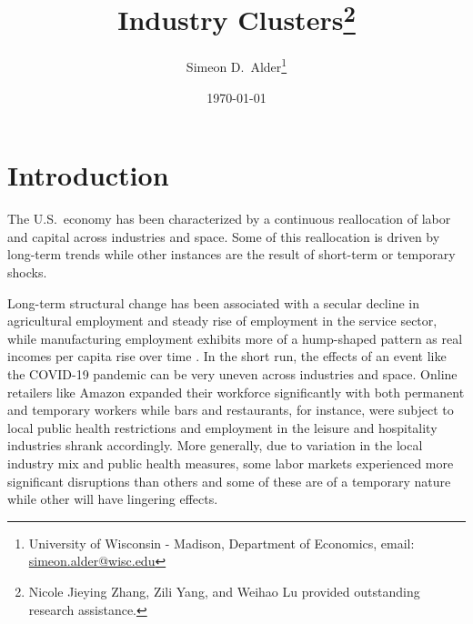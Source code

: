 \documentclass[onehalfspacing,11pt]{article}
\begin{document}
\begin{titlepage}

\title{Industry Clusters\footnote{Nicole Jieying Zhang, Zili Yang, and Weihao Lu provided outstanding research assistance.}}

\author{Simeon D.~Alder\footnote{University of Wisconsin - Madison, Department of Economics, email: \url{simeon.alder@wisc.edu}}}
\date{\today} %

\maketitle
%
%
%
\end{titlepage}


\section{Introduction}
The U.S.~economy has been characterized by a continuous reallocation of labor and capital across industries and space. Some of this reallocation is driven by long-term trends while other instances are the result of short-term or temporary shocks.

Long-term structural change has been associated with a secular decline in agricultural employment and steady rise of employment in the service sector, while manufacturing employment exhibits more of a hump-shaped pattern as real incomes per capita rise over time \citep{Herrendorf:2013b}. In the short run, the effects of an event like the COVID-19 pandemic can be very uneven across industries and space. Online retailers like Amazon expanded their workforce significantly with both permanent and temporary workers while bars and restaurants, for instance, were subject to local public health restrictions and employment in the leisure and hospitality industries shrank accordingly. More generally, due to variation in the local industry mix and public health measures, some labor markets experienced more significant disruptions than others and some of these are of a temporary nature while other will have lingering effects.
\end{document}

